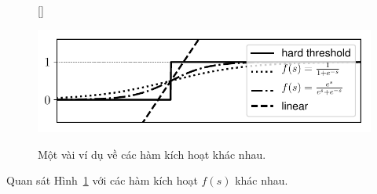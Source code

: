 \begin{figure}[t]
[\FBwidth]
{\caption{
Một vài ví dụ về các hàm kích hoạt khác nhau.
}
\label{fig:10_activation}}
{ %
\includegraphics[width=.6\textwidth]{ebookML_src/src/logistic_regression/activation.pdf}
}
\end{figure}
Quan sát Hình~\ref{fig:10_activation} với các hàm kích hoạt $f(s)$ khác nhau.
